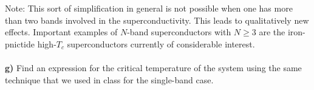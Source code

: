 \documentclass{article}
\begin{document}
\ \\
\ \\
Note: This sort of simplification in general is not possible when one has more than two bands involved in the superconductivity. This leads to qualitatively new effects. Important examples of $N$-band superconductors with $N \geq 3$ are the iron-pnictide high-$T_c$ superconductors currently of considerable interest.  
\ \\
\ \\
{\bf g)} Find an expression for the critical temperature of the system using the same technique that we used in class for the single-band case.  
\end{document}
